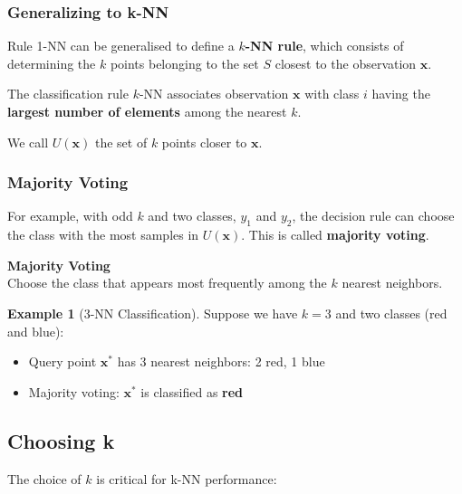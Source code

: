 \documentclass[11pt,a4paper]{article}
\theoremstyle{definition}
\newtheorem{example}{Example}[section]
\theoremstyle{plain}
\theoremstyle{remark}
\begin{document}
\subsubsection{Generalizing to k-NN}

Rule 1-NN can be generalised to define a \textbf{$k$-NN rule}, which consists of determining the $k$ points belonging to the set $S$ closest to the observation $\mathbf{x}$.

\begin{tcolorbox}[colback=purple!5!white,colframe=purple!75!black,title=\textbf{k-NN Classification Rule}]
The classification rule $k$-NN associates observation $\mathbf{x}$ with class $i$ having the \textbf{largest number of elements} among the nearest $k$.

We call $U(\mathbf{x})$ the set of $k$ points closer to $\mathbf{x}$.
\end{tcolorbox}

\subsubsection{Majority Voting}

For example, with odd $k$ and two classes, $y_1$ and $y_2$, the decision rule can choose the class with the most samples in $U(\mathbf{x})$. This is called \textbf{majority voting}.

\begin{center}
\colorbox{cyan!15}{\parbox{0.9\textwidth}{
\centering
\textbf{Majority Voting}\\[0.2cm]
Choose the class that appears most frequently among the $k$ nearest neighbors.
}}
\end{center}

\begin{example}[3-NN Classification]
Suppose we have $k=3$ and two classes (red and blue):
\begin{itemize}
    \item Query point $\mathbf{x}^*$ has 3 nearest neighbors: 2 red, 1 blue
    \item Majority voting: $\mathbf{x}^*$ is classified as \textbf{red}
\end{itemize}
\end{example}

\subsection{Choosing k}

The choice of $k$ is critical for k-NN performance:
\end{document}
